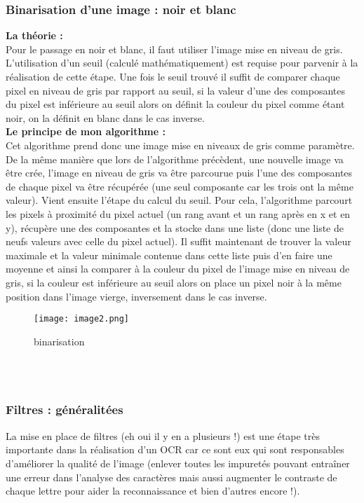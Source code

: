 \documentclass{article}
\begin{document}
                          \subsubsection {Binarisation d'une image : noir et blanc}
\textbf{La théorie :}\\
Pour le passage en noir et blanc, il faut utiliser l’image mise en niveau de gris. L’utilisation d’un seuil (calculé mathématiquement) est requise pour parvenir à la réalisation de cette étape. Une fois le seuil trouvé il suffit de comparer chaque pixel en niveau de gris par rapport au seuil, si la valeur d’une des composantes du pixel est inférieure au seuil alors on définit la couleur du pixel comme étant noir, on la définit en blanc dans le cas inverse.
\\

\textbf{Le principe de mon algorithme :} \\
Cet algorithme prend donc une image mise en niveaux de gris comme paramètre. De la même manière que lors de l’algorithme précèdent, une nouvelle image va être crée, l’image en niveau de gris va être parcourue puis l’une des composantes de chaque pixel va être récupérée (une seul composante car les trois ont la même valeur). Vient ensuite l’étape du calcul du seuil. Pour cela, l’algorithme parcourt les pixels à proximité du pixel actuel (un rang avant et un rang après en x et en y), récupère une des composantes et la stocke dans une liste (donc une liste de neufs valeurs avec celle du pixel actuel). Il suffit maintenant de trouver la valeur maximale et la valeur minimale contenue dans cette liste puis d’en faire une moyenne et ainsi la comparer à la couleur du pixel de l’image mise en niveau de gris, si la couleur est inférieure au seuil alors on place un pixel noir à la même position dans l’image vierge, inversement dans le cas inverse.
\newpage
\\
    \begin{figure}[hp]
	    \centering
	    \texttt{[image: image2.png]}
	    \caption{binarisation}
    \end{figure}
\\
\\
                          \subsubsection {Filtres : généralitées}
La mise en place de filtres (eh oui il y en a plusieurs !) est une étape très importante dans la réalisation d’un OCR car ce sont eux qui sont responsables d’améliorer la qualité de l’image (enlever toutes les impuretés pouvant entraîner une erreur dans l’analyse des caractères mais aussi augmenter le contraste de chaque lettre pour aider la reconnaissance et bien d’autres encore !).\\
\end{document}
